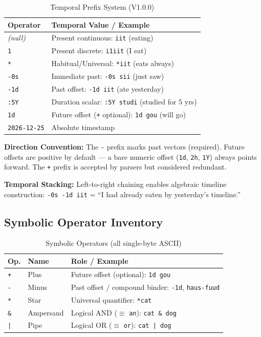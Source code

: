 \documentclass[10pt,onecolumn,letterpaper]{article}
\newcommand{\me}[1]{\texttt{#1}}
\begin{document}
\begin{table}[h!]
\centering\small
\begin{tabularx}{\linewidth}{lX}
\toprule
\textbf{Operator} & \textbf{Temporal Value / Example} \\
\midrule
\textit{(null)} & Present continuous: \me{iit} (eating) \\
\me{1}          & Present discrete: \me{i1iit} (I eat) \\
\me{*}          & Habitual/Universal: \me{*iit} (eats always) \\
\me{-0s}        & Immediate past: \me{-0s sii} (just saw) \\
\me{-1d}        & Past offset: \me{-1d iit} (ate yesterday) \\
\me{:5Y}        & Duration scalar: \me{:5Y studi} (studied for 5 yrs) \\
\me{1d}         & Future offset (\me{+} optional): \me{1d gou} (will go) \\
\me{2026-12-25} & Absolute timestamp \\
\bottomrule
\end{tabularx}
\caption{Temporal Prefix System (V1.0.0)}
\end{table}

\textbf{Direction Convention:} The \me{-} prefix marks past vectors
(required). Future offsets are positive by default --- a bare numeric offset
(\me{1d}, \me{2h}, \me{1Y}) always points forward. The \me{+} prefix is
accepted by parsers but considered redundant.

\textbf{Temporal Stacking:} Left-to-right chaining enables algebraic
timeline construction: \me{-0s -1d iit} = ``I had already eaten by
yesterday's timeline.''

\subsection{Symbolic Operator Inventory}

\begin{table}[h!]
\centering\small
\begin{tabularx}{\linewidth}{llX}
\toprule
\textbf{Op.} & \textbf{Name} & \textbf{Role / Example} \\
\midrule
\me{+}  & Plus      & Future offset (optional): \me{1d gou} \\
\me{-}  & Minus     & Past offset / compound binder: \me{-1d}, \me{haus-fuud} \\
\me{*}  & Star      & Universal quantifier: \me{*cat} \\
\me{\&} & Ampersand & Logical AND ($\equiv$ \me{an}): \me{cat \& dog} \\
\me{|}  & Pipe      & Logical OR ($\equiv$ \me{or}): \me{cat | dog} \\
\bottomrule
\end{tabularx}
\caption{Symbolic Operators (all single-byte ASCII)}
\end{table}
\end{document}
